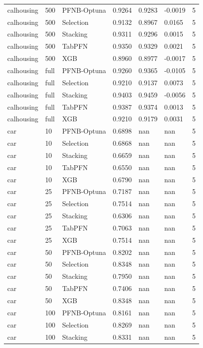 \begin{tabular}{llllllr}
calhousing & 500 & PFNB-Optuna & 0.9264 & 0.9283 & -0.0019 & 5 \\
calhousing & 500 & Selection & 0.9132 & 0.8967 & 0.0165 & 5 \\
calhousing & 500 & Stacking & 0.9311 & 0.9296 & 0.0015 & 5 \\
calhousing & 500 & TabPFN & 0.9350 & 0.9329 & 0.0021 & 5 \\
calhousing & 500 & XGB & 0.8960 & 0.8977 & -0.0017 & 5 \\
calhousing & full & PFNB-Optuna & 0.9260 & 0.9365 & -0.0105 & 5 \\
calhousing & full & Selection & 0.9210 & 0.9137 & 0.0073 & 5 \\
calhousing & full & Stacking & 0.9403 & 0.9459 & -0.0056 & 5 \\
calhousing & full & TabPFN & 0.9387 & 0.9374 & 0.0013 & 5 \\
calhousing & full & XGB & 0.9210 & 0.9179 & 0.0031 & 5 \\
car & 10 & PFNB-Optuna & 0.6898 & nan & nan & 5 \\
car & 10 & Selection & 0.6868 & nan & nan & 5 \\
car & 10 & Stacking & 0.6659 & nan & nan & 5 \\
car & 10 & TabPFN & 0.6550 & nan & nan & 5 \\
car & 10 & XGB & 0.6790 & nan & nan & 5 \\
car & 25 & PFNB-Optuna & 0.7187 & nan & nan & 5 \\
car & 25 & Selection & 0.7514 & nan & nan & 5 \\
car & 25 & Stacking & 0.6306 & nan & nan & 5 \\
car & 25 & TabPFN & 0.7063 & nan & nan & 5 \\
car & 25 & XGB & 0.7514 & nan & nan & 5 \\
car & 50 & PFNB-Optuna & 0.8202 & nan & nan & 5 \\
car & 50 & Selection & 0.8348 & nan & nan & 5 \\
car & 50 & Stacking & 0.7950 & nan & nan & 5 \\
car & 50 & TabPFN & 0.7406 & nan & nan & 5 \\
car & 50 & XGB & 0.8348 & nan & nan & 5 \\
car & 100 & PFNB-Optuna & 0.8161 & nan & nan & 5 \\
car & 100 & Selection & 0.8269 & nan & nan & 5 \\
car & 100 & Stacking & 0.8331 & nan & nan & 5 \\

\end{tabular}
